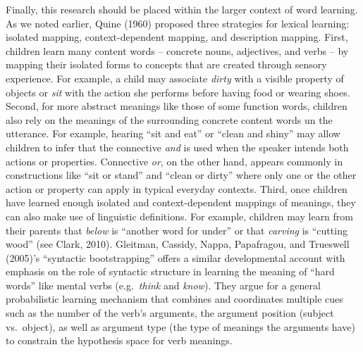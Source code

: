 \documentclass[
  english,
  ,man,floatsintext]{apa6}
\begin{document}
Finally, this research should be placed within the larger context of word learning. As we noted earlier, Quine (1960) proposed three strategies for lexical learning: isolated mapping, context-dependent mapping, and description mapping. First, children learn many content words -- concrete nouns, adjectives, and verbs -- by mapping their isolated forms to concepts that are created through sensory experience. For example, a child may associate \emph{dirty} with a visible property of objects or \emph{sit} with the action she performs before having food or wearing shoes. Second, for more abstract meanings like those of some function words, children also rely on the meanings of the surrounding concrete content words un the utterance. For example, hearing ``sit and eat'' or ``clean and shiny'' may allow children to infer that the connective \emph{and} is used when the speaker intends both actions or properties. Connective \emph{or}, on the other hand, appears commonly in constructions like ``sit or stand'' and ``clean or dirty'' where only one or the other action or property can apply in typical everyday contexts. Third, once children have learned enough isolated and context-dependent mappings of meanings, they can also make use of linguistic definitions. For example, children may learn from their parents that \emph{below} is ``another word for under'' or that \emph{carving} is ``cutting wood'' (see Clark, 2010). Gleitman, Cassidy, Nappa, Papafragou, and Trueswell (2005)'s ``syntactic bootstrapping'' offers a similar developmental account with emphasis on the role of syntactic structure in learning the meaning of ``hard words'' like mental verbs (e.g.~\emph{think} and \emph{know}). They argue for a general probabilistic learning mechanism that combines and coordinates multiple cues such as the number of the verb's arguments, the argument position (subject vs.~object), as well as argument type (the type of meanings the arguments have) to constrain the hypothesis space for verb meanings.
\end{document}
